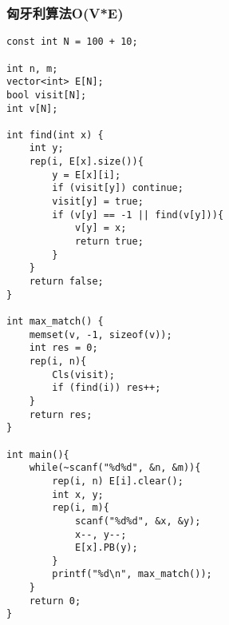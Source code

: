 \subsubsection{匈牙利算法O(V*E)}
\begin{verbatim}
const int N = 100 + 10;

int n, m;
vector<int> E[N];
bool visit[N];
int v[N];

int find(int x) {
    int y;
    rep(i, E[x].size()){
        y = E[x][i];
        if (visit[y]) continue;
        visit[y] = true;
        if (v[y] == -1 || find(v[y])){
            v[y] = x;
            return true;
        }
    }
    return false;
}

int max_match() {
    memset(v, -1, sizeof(v));
    int res = 0;
    rep(i, n){
        Cls(visit);
        if (find(i)) res++;
    }
    return res;
}

int main(){
    while(~scanf("%d%d", &n, &m)){
        rep(i, n) E[i].clear();
        int x, y;
        rep(i, m){
            scanf("%d%d", &x, &y);
            x--, y--;
            E[x].PB(y);
        }
        printf("%d\n", max_match());
    }
    return 0;
}
\end{verbatim}
